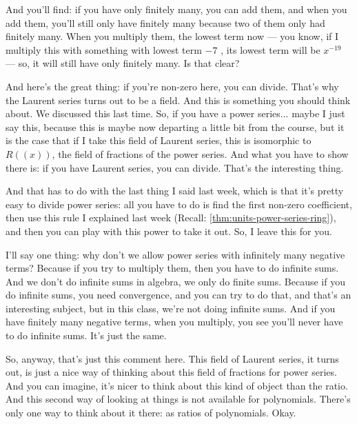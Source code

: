 \begin{speech}[00:12:45 - 00:14:25]
And you'll find: if you have only finitely many, you can add them, and when you add them, you'll still only have finitely many because two of them only had finitely many. When you multiply them, the lowest term now --- you know, if I multiply this with something with lowest term $-7$ , its lowest term will be $x^{-19}$ --- so, it will still have only finitely many. Is that clear? 

And here's the great thing: if you're non-zero here, you can divide. That's why the Laurent series turns out to be a field. And this is something you should think about. We discussed this last time. So, if you have a power series... maybe I just say this, because this is maybe now departing a little bit from the course, but it is the case that if I take this field of Laurent series,  this is isomorphic to $R((x))$,  the field of fractions of the power series. And what you have to show there is: if you have Laurent series, you can divide. That's the interesting thing. 

And that has to do with the last thing I said last week, which is that it's pretty easy to divide power series: all you have to do is find the first non-zero coefficient, then use this rule I explained last week (Recall: \cref{thm:units-power-series-ring}), and then you can play with this power to take it out. So, I leave this for you.
\end{speech}

\begin{speech}[00:14:25 - 00:15:20]
I'll say one thing: why don't we allow power series with infinitely many negative terms? Because if you try to multiply them, then you have to do infinite sums. And we don't do infinite sums in algebra, we only do finite sums. Because if you do infinite sums, you need convergence, and you can try to do that, and that's an interesting subject, but in this class, we're not doing infinite sums. And if you have finitely many negative terms, when you multiply, you see you'll never have to do infinite sums. It's just the same. 

So, anyway, that's just this comment here. This field of Laurent series, it turns out, is just a nice way of thinking about this field of fractions for power series. And you can imagine, it's nicer to think about this kind of object than the ratio. And this second way of looking at things is not available for polynomials. There's only one way to think about it there: as ratios of polynomials. Okay.
\end{speech}

